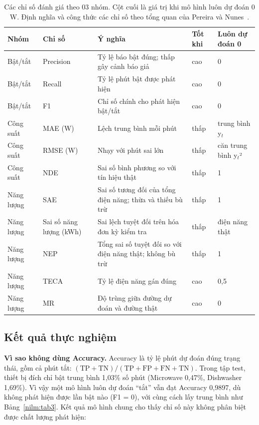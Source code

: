 \begin{table}[H]
\centering
\caption{Các chỉ số đánh giá theo 03 nhóm. Cột cuối là giá trị khi mô hình luôn dự đoán 0 W. Định nghĩa và công thức các chỉ số theo tổng quan của Pereira và Nunes~\citep{pereira2018}.}\label{nilm:tab2}
\small
\setlength{\tabcolsep}{3.5pt}\renewcommand{\arraystretch}{1.12}
\begin{tabularx}{\linewidth}{|l|l|X|l|l|}
\hline
\textbf{Nhóm} & \textbf{Chỉ số} & \textbf{Ý nghĩa} & \textbf{Tốt khi} & \textbf{Luôn dự đoán 0} \\ \hline
Bật/tắt & Precision & Tỷ lệ báo bật đúng; thấp gây cảnh báo giả & cao & 0 \\ \hline
Bật/tắt & Recall & Tỷ lệ phút bật được phát hiện & cao & 0 \\ \hline
Bật/tắt & F1 & Chỉ số chính cho phát hiện bật/tắt & cao & 0 \\ \hline
Công suất & MAE (W) & Lệch trung bình mỗi phút & thấp & trung bình y$_t$ \\ \hline
Công suất & RMSE (W) & Nhạy với phút sai lớn & thấp & căn trung bình y$_t$² \\ \hline
Công suất & NDE & Sai số bình phương so với tín hiệu thật & thấp & 1 \\ \hline
Năng lượng & SAE & Sai số tương đối của tổng điện năng; thừa và thiếu bù trừ & thấp & 1 \\ \hline
Năng lượng & Sai số năng lượng (kWh) & Sai lệch tuyệt đối trên hóa đơn kỳ kiểm tra & thấp & điện năng thật \\ \hline
Năng lượng & NEP & Tổng sai số tuyệt đối so với điện năng thật; không bù trừ & thấp & 1 \\ \hline
Năng lượng & TECA & Tỷ lệ điện năng gán đúng & cao & 0,5 \\ \hline
Năng lượng & MR & Độ trùng giữa đường dự đoán và đường thật & cao & 0 \\ \hline
\end{tabularx}
\end{table}

\subsection{Kết quả thực nghiệm}

\textbf{Vì sao không dùng Accuracy.} Accuracy là tỷ lệ phút dự đoán đúng trạng thái, gồm cả phút tắt: $(\mathrm{TP} + \mathrm{TN}) / (\mathrm{TP} + \mathrm{FP} + \mathrm{FN} + \mathrm{TN})$. Trong tập test, thiết bị đích chỉ bật trung bình 1,03\% số phút (Microwave 0,47\%, Dishwasher 1,69\%). Vì vậy một mô hình luôn dự đoán “tắt” vẫn đạt Accuracy 0,9897, dù không phát hiện được lần bật nào (F1 = 0), với cùng cách lấy trung bình như Bảng~\ref{nilm:tab3}. Kết quả mô hình chung cho thấy chỉ số này không phân biệt được chất lượng phát hiện:

